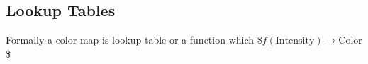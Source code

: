 \documentclass[letterpaper,10pt,english]{sphinxmanual}
\begin{document}
\noindent{}

\begin{sphinxVerbatim}[commandchars=\\\{\}]
     
\end{sphinxVerbatim}

\noindent{}


\subsection{Lookup Tables}
\label{\detokenize{01-Introduction:lookup-tables}}
\sphinxAtStartPar
Formally a color map is lookup table or a function which
\$\( f(\textrm{Intensity}) \rightarrow \textrm{Color} \)\$
\end{document}
